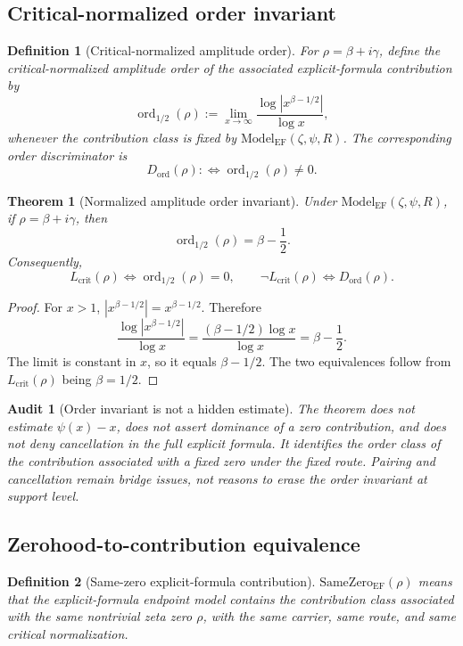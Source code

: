 \documentclass[11pt]{article}
\newtheorem{definition}{Definition}[section]
\newtheorem{theorem}{Theorem}[section]
\newtheorem{audit}{Audit}[section]
\newcommand{\Lcrit}{L_{\mathrm{crit}}}
\newcommand{\ModelEF}{\mathrm{Model}_{\mathrm{EF}}}
\newcommand{\ordhalf}{\operatorname{ord}_{1/2}}
\newcommand{\Dord}{D_{\mathrm{ord}}}
\newcommand{\SameZeroEF}{\mathrm{SameZero}_{\mathrm{EF}}}
\begin{document}
\subsection{Critical-normalized order invariant}

\begin{definition}[Critical-normalized amplitude order]
For \(\rho=\beta+i\gamma\), define the critical-normalized amplitude order of the associated explicit-formula contribution by
\[
\ordhalf(\rho):=\lim_{x\to\infty}\frac{\log |x^{\beta-1/2}|}{\log x},
\]
whenever the contribution class is fixed by \(\ModelEF(\zeta,\psi,R)\).  The corresponding order discriminator is
\[
\Dord(\rho):\Longleftrightarrow \ordhalf(\rho)\ne 0.
\]
\end{definition}

\begin{theorem}[Normalized amplitude order invariant]
Under \(\ModelEF(\zeta,\psi,R)\), if \(\rho=\beta+i\gamma\), then
\[
\ordhalf(\rho)=\beta-\frac12.
\]
Consequently,
\[
\Lcrit(\rho)\Longleftrightarrow \ordhalf(\rho)=0,
\qquad
\neg\Lcrit(\rho)\Longleftrightarrow \Dord(\rho).
\]
\end{theorem}

\begin{proof}
For \(x>1\), \(|x^{\beta-1/2}|=x^{\beta-1/2}\).  Therefore
\[
\frac{\log |x^{\beta-1/2}|}{\log x}=\frac{(\beta-1/2)\log x}{\log x}=\beta-\frac12.
\]
The limit is constant in \(x\), so it equals \(\beta-1/2\).  The two equivalences follow from \(\Lcrit(\rho)\) being \(\beta=1/2\).
\end{proof}

\begin{audit}[Order invariant is not a hidden estimate]
The theorem does not estimate \(\psi(x)-x\), does not assert dominance of a zero contribution, and does not deny cancellation in the full explicit formula.  It identifies the order class of the contribution associated with a fixed zero under the fixed route.  Pairing and cancellation remain bridge issues, not reasons to erase the order invariant at support level.
\end{audit}

\subsection{Zerohood-to-contribution equivalence}

\begin{definition}[Same-zero explicit-formula contribution]
\(\SameZeroEF(\rho)\) means that the explicit-formula endpoint model contains the contribution class associated with the same nontrivial zeta zero \(\rho\), with the same carrier, same route, and same critical normalization.
\end{definition}
\end{document}
